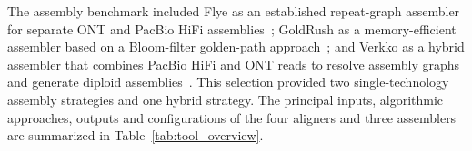 \documentclass[12pt, letterpaper]{article}
\begin{document}
The assembly benchmark included Flye as an established repeat-graph assembler for separate ONT and PacBio HiFi assemblies~\cite{Kolmogorov2019,Kolmogorov2020}; GoldRush as a memory-efficient assembler based on a Bloom-filter golden-path approach~\cite{Wong2022,Wong2023}; and Verkko as a hybrid assembler that combines PacBio HiFi and ONT reads to resolve assembly graphs and generate diploid assemblies~\cite{Rautiainen2023,Bankevich2022}. This selection provided two single-technology assembly strategies and one hybrid strategy. The principal inputs, algorithmic approaches, outputs and configurations of the four aligners and three assemblers are summarized in Table~\ref{tab:tool_overview}.

\end{document}
